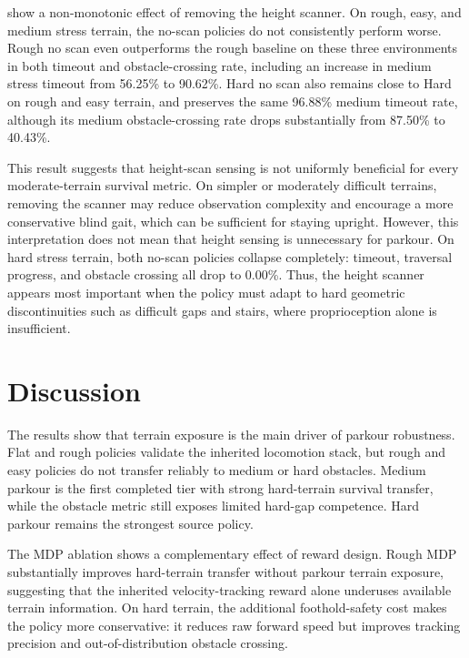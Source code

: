 \documentclass{article}
\begin{document}
 show a non-monotonic effect of removing the height scanner. On rough, easy, and medium stress terrain, the no-scan policies do not consistently perform worse. Rough no scan even outperforms the rough baseline on these three environments in both timeout and obstacle-crossing rate, including an increase in medium stress timeout from 56.25\% to 90.62\%. Hard no scan also remains close to Hard on rough and easy terrain, and preserves the same 96.88\% medium timeout rate, although its medium obstacle-crossing rate drops substantially from 87.50\% to 40.43\%.

This result suggests that height-scan sensing is not uniformly beneficial for every moderate-terrain survival metric. On simpler or moderately difficult terrains, removing the scanner may reduce observation complexity and encourage a more conservative blind gait, which can be sufficient for staying upright. However, this interpretation does not mean that height sensing is unnecessary for parkour. On hard stress terrain, both no-scan policies collapse completely: timeout, traversal progress, and obstacle crossing all drop to 0.00\%. Thus, the height scanner appears most important when the policy must adapt to hard geometric discontinuities such as difficult gaps and stairs, where proprioception alone is insufficient.

\section{Discussion}
\label{sec:discussion}

The results show that terrain exposure is the main driver of parkour robustness. Flat and rough policies validate the inherited locomotion stack, but rough and easy policies do not transfer reliably to medium or hard obstacles. Medium parkour is the first completed tier with strong hard-terrain survival transfer, while the obstacle metric still exposes limited hard-gap competence. Hard parkour remains the strongest source policy.

The MDP ablation shows a complementary effect of reward design. Rough MDP substantially improves hard-terrain transfer without parkour terrain exposure, suggesting that the inherited velocity-tracking reward alone underuses available terrain information. On hard terrain, the additional foothold-safety cost makes the policy more conservative: it reduces raw forward speed but improves tracking precision and out-of-distribution obstacle crossing.
\end{document}
